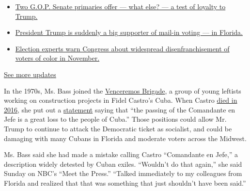 \begin{itemize}
\tightlist
\item
  \href{https://www.nytimes.com/2020/08/04/us/elections/primary-election-michigan-arizona-kansas.html?action=click\&pgtype=Article\&state=default\&region=MAIN_CONTENT_1\&context=storylines_live_updates\#link-3924dd44}{Two
  G.O.P. Senate primaries offer --- what else? --- a test of loyalty to
  Trump.}
\item
  \href{https://www.nytimes.com/2020/08/04/us/elections/primary-election-michigan-arizona-kansas.html?action=click\&pgtype=Article\&state=default\&region=MAIN_CONTENT_1\&context=storylines_live_updates\#link-32b39e33}{President
  Trump is suddenly a big supporter of mail-in voting --- in Florida.}
\item
  \href{https://www.nytimes.com/2020/08/04/us/elections/primary-election-michigan-arizona-kansas.html?action=click\&pgtype=Article\&state=default\&region=MAIN_CONTENT_1\&context=storylines_live_updates\#link-6d019753}{Election
  experts warn Congress about widespread disenfranchisement of voters of
  color in November.}
\end{itemize}

\href{https://www.nytimes.com/2020/08/04/us/elections/primary-election-michigan-arizona-kansas.html?action=click\&pgtype=Article\&state=default\&region=MAIN_CONTENT_1\&context=storylines_live_updates}{See
more updates}

In the 1970s, Ms. Bass joined the
\href{https://www.theatlantic.com/politics/archive/2020/07/karen-bass-cuba-venceremos-brigade/614662/}{Venceremos
Brigade}, a group of young leftists working on construction projects in
Fidel Castro's Cuba. When Castro
\href{https://www.nytimes.com/2016/11/26/world/americas/fidel-castro-dies.html}{died
in 2016}, she put out a
\href{https://bass.house.gov/media-center/press-releases/rep-bass-statement-passing-fidel-castro}{statement}
saying that ``the passing of the Comandante en Jefe is a great loss to
the people of Cuba.'' Those positions could allow Mr. Trump to continue
to attack the Democratic ticket as socialist, and could be damaging with
many Cubans in Florida and moderate voters across the Midwest.

Ms. Bass said she had made a mistake calling Castro ``Comandante en
Jefe,'' a description widely detested by Cuban exiles. ``Wouldn't do
that again,'' she said Sunday on NBC's ``Meet the Press.'' ``Talked
immediately to my colleagues from Florida and realized that that was
something that just shouldn't have been said.''

